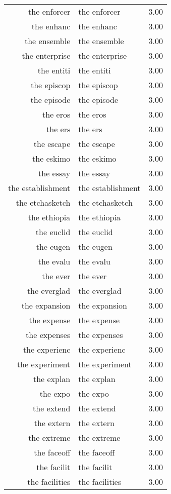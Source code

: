 \begin{table}[ht]
\begin{tabular}{rlr}
  the enforcer & the enforcer & 3.00 \\ 
  the enhanc & the enhanc & 3.00 \\ 
  the ensemble & the ensemble & 3.00 \\ 
  the enterprise & the enterprise & 3.00 \\ 
  the entiti & the entiti & 3.00 \\ 
  the episcop & the episcop & 3.00 \\ 
  the episode & the episode & 3.00 \\ 
  the eros & the eros & 3.00 \\ 
  the ers & the ers & 3.00 \\ 
  the escape & the escape & 3.00 \\ 
  the eskimo & the eskimo & 3.00 \\ 
  the essay & the essay & 3.00 \\ 
  the establishment & the establishment & 3.00 \\ 
  the etchasketch & the etchasketch & 3.00 \\ 
  the ethiopia & the ethiopia & 3.00 \\ 
  the euclid & the euclid & 3.00 \\ 
  the eugen & the eugen & 3.00 \\ 
  the evalu & the evalu & 3.00 \\ 
  the ever & the ever & 3.00 \\ 
  the everglad & the everglad & 3.00 \\ 
  the expansion & the expansion & 3.00 \\ 
  the expense & the expense & 3.00 \\ 
  the expenses & the expenses & 3.00 \\ 
  the experienc & the experienc & 3.00 \\ 
  the experiment & the experiment & 3.00 \\ 
  the explan & the explan & 3.00 \\ 
  the expo & the expo & 3.00 \\ 
  the extend & the extend & 3.00 \\ 
  the extern & the extern & 3.00 \\ 
  the extreme & the extreme & 3.00 \\ 
  the faceoff & the faceoff & 3.00 \\ 
  the facilit & the facilit & 3.00 \\ 
  the facilities & the facilities & 3.00 \\ 

\end{tabular}
\end{table}
